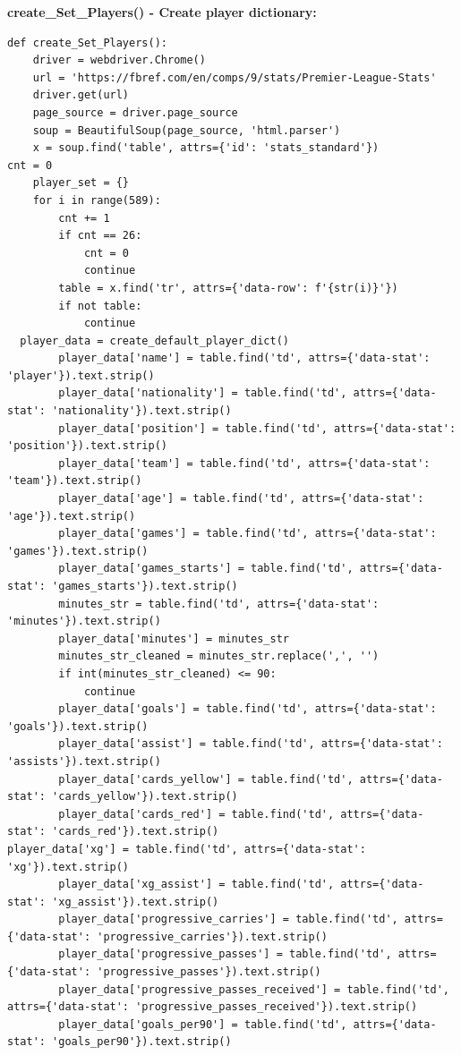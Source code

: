\documentclass[12pt]{report}
\begin{document}
{\textbf*{create\_Set\_Players() - Create player dictionary:} %
\begin{lstlisting}
def create_Set_Players():
    driver = webdriver.Chrome()
    url = 'https://fbref.com/en/comps/9/stats/Premier-League-Stats'
    driver.get(url)
    page_source = driver.page_source
    soup = BeautifulSoup(page_source, 'html.parser')
    x = soup.find('table', attrs={'id': 'stats_standard'})
cnt = 0
    player_set = {}
    for i in range(589):
        cnt += 1
        if cnt == 26:
            cnt = 0
            continue
        table = x.find('tr', attrs={'data-row': f'{str(i)}'})
        if not table:
            continue
  player_data = create_default_player_dict()
        player_data['name'] = table.find('td', attrs={'data-stat': 'player'}).text.strip()
        player_data['nationality'] = table.find('td', attrs={'data-stat': 'nationality'}).text.strip()
        player_data['position'] = table.find('td', attrs={'data-stat': 'position'}).text.strip()
        player_data['team'] = table.find('td', attrs={'data-stat': 'team'}).text.strip()
        player_data['age'] = table.find('td', attrs={'data-stat': 'age'}).text.strip()
        player_data['games'] = table.find('td', attrs={'data-stat': 'games'}).text.strip()
        player_data['games_starts'] = table.find('td', attrs={'data-stat': 'games_starts'}).text.strip()
        minutes_str = table.find('td', attrs={'data-stat':
'minutes'}).text.strip()
        player_data['minutes'] = minutes_str
        minutes_str_cleaned = minutes_str.replace(',', '')
        if int(minutes_str_cleaned) <= 90:
            continue
        player_data['goals'] = table.find('td', attrs={'data-stat': 'goals'}).text.strip()
        player_data['assist'] = table.find('td', attrs={'data-stat': 'assists'}).text.strip()
        player_data['cards_yellow'] = table.find('td', attrs={'data-stat': 'cards_yellow'}).text.strip()
        player_data['cards_red'] = table.find('td', attrs={'data-stat': 'cards_red'}).text.strip()
player_data['xg'] = table.find('td', attrs={'data-stat': 'xg'}).text.strip()
        player_data['xg_assist'] = table.find('td', attrs={'data-stat': 'xg_assist'}).text.strip()
        player_data['progressive_carries'] = table.find('td', attrs={'data-stat': 'progressive_carries'}).text.strip()
        player_data['progressive_passes'] = table.find('td', attrs={'data-stat': 'progressive_passes'}).text.strip()
        player_data['progressive_passes_received'] = table.find('td', attrs={'data-stat': 'progressive_passes_received'}).text.strip()
        player_data['goals_per90'] = table.find('td', attrs={'data-stat': 'goals_per90'}).text.strip()

\end{lstlisting}}
\end{document}
